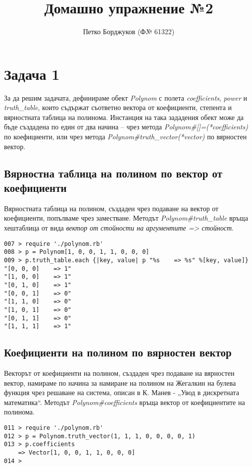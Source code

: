 \documentclass[a4paper,notitlepage,oneside]{report}
\title{Домашно упражнение №2}
\author{Петко Борджуков (Ф№ 61322)}
\date{}
\begin{document}
\maketitle
\setcounter{secnumdepth}{0}
\section{Задача 1}

За да решим задачата, дефинираме обект \emph{Polynom} с полета \emph{coefficients}, \emph{power} и \emph{truth\_table}, които съдържат съответно вектора от коефициенти, степента и вярностната таблица на полинома. Инстанция на така зададения обект може да бъде създадена по един от два начина -- чрез метода \emph{Polynom\#[]=(*coefficients)} по коефициенти, или чрез метода \emph{Polynom\#truth\_vector(*vector)} по вярностен вектор.

\subsection{Вярностна таблица на полином по вектор от коефициенти}
Вярностната таблица на полином, създаден чрез подаване на вектор от коефициенти, попълваме чрез заместване. Методът \emph{Polynom\#truth\_table} връща хештаблица от вида \emph{вектор от стойности на аргументите    => стойност}.

\begin{lstlisting}
007 > require './polynom.rb'
008 > p = Polynom[1, 0, 0, 1, 1, 0, 0, 0]
009 > p.truth_table.each {|key, value| p "%s    => %s" %[key, value]}
"[0, 0, 0]    => 1"
"[1, 0, 0]    => 1"
"[0, 1, 0]    => 1"
"[0, 0, 1]    => 0"
"[1, 1, 0]    => 0"
"[1, 0, 1]    => 0"
"[0, 1, 1]    => 0"
"[1, 1, 1]    => 1"
\end{lstlisting}


\subsection{Коефициенти на полином по вярностен вектор}
Векторът от коефициенти на полином, създаден чрез подаване на вярностен вектор, намираме по начина за намиране на полином на Жегалкин на булева функция чрез решаване на система, описан в К. Манев - „Увод в дискретната математика“. Методът \emph{Polynom\#coefficients} връща вектор от коефициентите на полинома.

\begin{lstlisting}
011 > require './polynom.rb'
012 > p = Polynom.truth_vector(1, 1, 1, 0, 0, 0, 0, 1) 
013 > p.coefficients
    => Vector[1, 0, 0, 1, 1, 0, 0, 0] 
014 >
\end{lstlisting}
\end{document}
